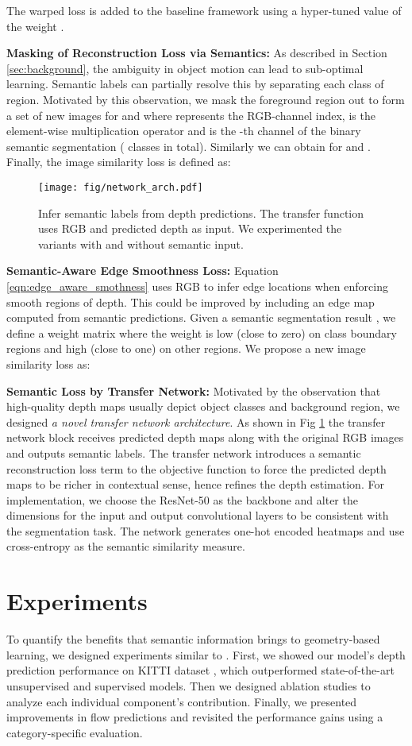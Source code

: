 \documentclass[10pt,twocolumn]{article}
\newcommand{\Noindent}{\vspace{2pt} \noindent}
\newcommand{\partitle}[1]{\Noindent\textbf{#1: }}
\begin{document}
The warped loss is added to the baseline framework using a hyper-tuned value of the weight .

\partitle{Masking of Reconstruction Loss via Semantics}As described in Section \ref{sec:background}, the ambiguity in object motion can lead to sub-optimal learning. Semantic labels can partially resolve this by separating each class of region. Motivated by this observation, we mask the foreground region out to form a set of new images  for  and  where  represents the RGB-channel index,  is the element-wise multiplication operator and  is the -th channel of the binary semantic segmentation ( classes in total). Similarly we can obtain  for  and . Finally, the image similarity loss is defined as:
    

\begin{figure}[ht]
    \centering
    \texttt{[image: fig/network\_arch.pdf]}
    \caption{Infer semantic labels from depth predictions. The transfer function uses RGB and predicted depth as input. We experimented the variants with and without semantic input. }
    \label{fig:arch_with_transfer}
\end{figure}

\partitle{Semantic-Aware Edge Smoothness Loss}Equation \ref{eqn:edge_aware_smothness} uses RGB to infer edge locations when enforcing smooth regions of depth. This could be improved by including an edge map computed from semantic predictions. Given a semantic segmentation result , we define a weight matrix  where the weight is low (close to zero) on class boundary regions and high (close to one) on other regions. We propose a new image similarity loss as:
    

\partitle{Semantic Loss by Transfer Network}Motivated by the observation that high-quality depth maps usually depict object classes and background region, we designed \textit{a novel transfer network architecture}. As shown in Fig \ref{fig:arch_with_transfer} the transfer network block receives predicted depth maps along with the original RGB images and outputs semantic labels. The transfer network introduces a semantic reconstruction loss term to the objective function to force the predicted depth maps to be richer in contextual sense, hence refines the depth estimation. For implementation, we choose the ResNet-50 as the backbone and alter the dimensions for the input and output convolutional layers to be consistent with the segmentation task. The network generates one-hot encoded heatmaps and use cross-entropy as the semantic similarity measure. \section{Experiments}
\label{sec:experiments}
To quantify the benefits that semantic information brings to geometry-based learning, we designed experiments similar to \cite{yin2018geonet}. First, we showed our model's depth prediction performance on KITTI dataset \cite{geiger2012we}, which outperformed state-of-the-art unsupervised and supervised models. Then we designed ablation studies to analyze each individual component's contribution. Finally, we presented improvements in flow predictions and revisited the performance gains using a  category-specific evaluation.
\end{document}
